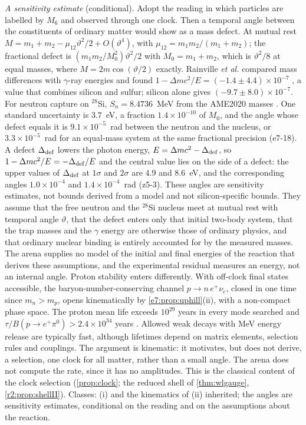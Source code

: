 \emph{A sensitivity estimate} (conditional). Adopt the reading in which particles are labelled by $M_6$ and observed through one
clock. Then a temporal angle between the constituents of ordinary matter would show as a mass defect. At mutual rest
$M=m_1+m_2-\mu_{12}\vartheta^2/2+O(\vartheta^4)$, with $\mu_{12}=m_1m_2/(m_1+m_2)$; the fractional defect is $(m_1m_2/M_0^2)\vartheta^2/2$ with
$M_0=m_1+m_2$, which is $\vartheta^2/8$ at equal masses, where $M=2m\cos(\vartheta/2)$ exactly. Rainville \emph{et al.} compared mass differences
with $\gamma$-ray energies and found $1-\Delta mc^2/E=(-1.4\pm4.4)\times10^{-7}$ \cite{Rainville05}, a value that combines silicon and sulfur; silicon alone
gives $(-9.7\pm8.0)\times10^{-7}$. For neutron capture on $^{28}$Si,
$S_n=8.4736$~MeV from the AME2020 masses \cite{AME2020}. One standard uncertainty is $3.7$~eV, a fraction $1.4\times10^{-10}$ of $M_0$, and the
angle whose defect equals it is $9.1\times10^{-5}$~rad between the neutron and the nucleus, or $3.3\times10^{-5}$~rad for an equal-mass system at
the same fractional precision (e7-18). A defect $\Delta_{\rm def}$ lowers the photon energy, $E=\Delta mc^2-\Delta_{\rm def}$, so $1-\Delta mc^2/E=-\Delta_{\rm def}/E$ and the central value
lies on the side of a defect: the upper values of $\Delta_{\rm def}$ at $1\sigma$ and $2\sigma$ are $4.9$ and $8.6$~eV, and the corresponding angles
$1.0\times10^{-4}$ and $1.4\times10^{-4}$~rad (z5-3). These angles are sensitivity estimates, not bounds derived from a model and not
silicon-specific bounds. They assume that
the free neutron and the $^{28}$Si nucleus meet at mutual rest with temporal angle $\vartheta$, that the defect enters only that initial
two-body system, that the trap masses and the $\gamma$ energy are otherwise those of ordinary physics, and that ordinary nuclear binding is
entirely accounted for by the measured masses. The arena supplies no model of the initial and final energies of the reaction that derives these
assumptions, and the experimental residual measures an energy, not an internal angle. Proton stability enters differently. With off-clock final states accessible, the baryon-number-conserving
channel $p\to n\,e^+\nu_e$, closed in one time since $m_n>m_p$, opens kinematically by \cref{e7:prop:uphill}(ii), with a non-compact phase space. The
proton mean life exceeds $10^{29}$ years in every mode searched and $\tau/B(p\to e^+\pi^0)>2.4\times10^{34}$ years \cite{PDG,Takenaka20}. Allowed weak
decays with MeV energy release are typically fast, although lifetimes depend on matrix elements, selection rules and couplings. The argument is
kinematic: it motivates, but does not derive, a selection, one clock for all matter, rather than a small angle. The arena does not compute the rate, since it has no amplitudes. This is the classical content of the clock selection
(\cref{prop:clock}; the reduced shell of \cref{thm:wlgauge}, \cref{r2:prop:shellII}). Classes: (i) and the
kinematics of (ii) inherited; the angles are sensitivity estimates, conditional on the reading and on the assumptions about the reaction.

